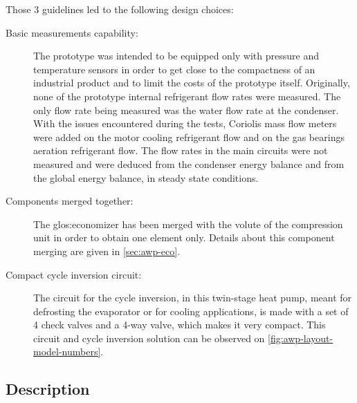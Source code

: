 Those 3 guidelines led to the following design choices:
\begin{description}
\item[Basic measurements capability:] The prototype was intended to be
  equipped only with pressure and temperature sensors in order to get
  close to the compactness of an industrial product and to limit the
  costs of the prototype itself. Originally, none of the prototype
  internal refrigerant flow rates were measured. The only flow rate
  being measured was the water flow rate at the condenser. With the
  issues encountered during the tests, Coriolis mass flow meters were
  added on the motor cooling refrigerant flow and on the gas bearings
  aeration refrigerant flow. The flow rates in the main circuits were
  not measured and were deduced from the condenser energy
  balance and from the global energy balance, in steady state
  conditions.
\item[Components merged together:] The
  \gls{glos:economizer} has been merged with the
  volute of the compression unit in order to obtain one element
  only. Details about this component merging are given in
  \cref{sec:awp-eco}.
\item[Compact cycle inversion circuit:] The circuit for the cycle
  inversion, in this twin-stage heat pump, meant for defrosting the
  evaporator or for cooling applications, is made with a set of 4
  check valves and a
  4-way valve,
  which makes it very compact. This circuit and cycle inversion
  solution can be observed on \cref{fig:awp-layout-model-numbers}.
\end{description}

\subsection{Description}
\label{sec:awp-description}


